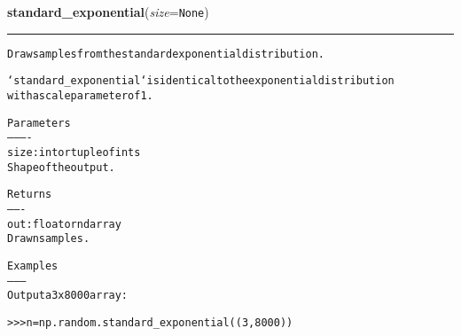     \label{QSTK:qstklearn:mldiagnostics:standard_exponential}

    \vspace{0.5ex}

\hspace{.8\funcindent}\begin{boxedminipage}{\funcwidth}

    \raggedright \textbf{standard\_exponential}(\textit{size}={\tt None})

    \vspace{-1.5ex}

    \rule{\textwidth}{0.5\fboxrule}
\setlength{\parskip}{2ex}
\begin{alltt}
Draw samples from the standard exponential distribution.

`standard\_exponential` is identical to the exponential distribution
with a scale parameter of 1.

Parameters
----------
size : int or tuple of ints
    Shape of the output.

Returns
-------
out : float or ndarray
    Drawn samples.

Examples
--------
Output a 3x8000 array:

{\textgreater}{\textgreater}{\textgreater} n = np.random.standard\_exponential((3, 8000))
\end{alltt}

\setlength{\parskip}{1ex}
    \end{boxedminipage}

    \label{QSTK:qstklearn:mldiagnostics:standard_gamma}

    \vspace{0.5ex}

